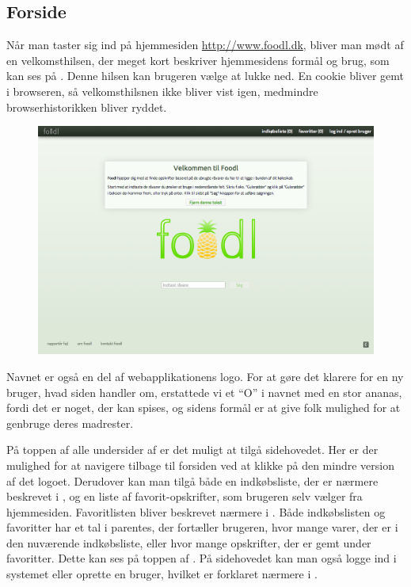\subsection{Forside}
\label{subsec:brug-forside}

Når man taster sig ind på hjemmesiden \url{http://www.foodl.dk}, bliver man mødt af en velkomsthilsen, der meget kort beskriver hjemmesidens formål og brug, som kan ses på . Denne hilsen kan brugeren vælge at lukke ned. En cookie bliver gemt i browseren, så velkomsthilsnen ikke bliver vist igen, medmindre browserhistorikken bliver ryddet.

\begin{figure}[H]
	\centering
	\includegraphics[scale=0.3]{billeder/foodl/thumbnails/forside.png}
	\label{fig:overblik-forside}
\end{figure}

Navnet \Foodl{} er også en del af webapplikationens logo. For at gøre det klarere for en ny bruger, hvad siden handler om, erstattede vi et ``O'' i navnet med en stor ananas, fordi det er noget, der kan spises, og sidens formål er at give folk mulighed for at genbruge deres madrester. 

På toppen af alle undersider af \Foodl{} er det muligt at tilgå sidehovedet. Her er der mulighed for at navigere tilbage til forsiden ved at klikke på den mindre version af det logoet. Derudover kan man tilgå både en indkøbsliste, der er nærmere beskrevet i , og en liste af favorit-opskrifter, som brugeren selv vælger fra hjemmesiden. Favoritlisten bliver beskrevet nærmere i . Både indkøbslisten og favoritter har et tal i parentes, der fortæller brugeren, hvor mange varer, der er i den nuværende indkøbsliste, eller hvor mange opskrifter, der er gemt under favoritter. Dette kan ses på toppen af . På sidehovedet kan man også logge ind i systemet eller oprette en bruger, hvilket er forklaret nærmere i .

